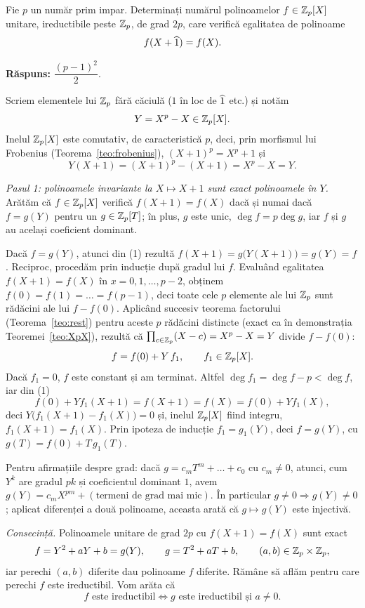 \begin{problema}
Fie $p$ un număr prim impar. Determinați numărul polinoamelor $f\in\mathbb{Z}_p[X]$ unitare, ireductibile peste $\mathbb{Z}_p$, de grad $2p$, care verifică egalitatea de polinoame
\[
  f(X+\widehat{1})=f(X).
\]
\end{problema}

\noindent\textbf{Răspuns:} $\dfrac{(p-1)^2}{2}$.

\begin{solutie}
Scriem elementele lui $\mathbb{Z}_p$ fără căciulă ($1$ în loc de $\widehat{1}$ etc.) și notăm
\[
  Y=X^p-X\in\mathbb{Z}_p[X].
\]
Inelul $\mathbb{Z}_p[X]$ este comutativ, de caracteristică $p$, deci, prin morfismul lui Frobenius (Teorema~\ref{teo:frobenius}), $(X+1)^p=X^p+1$ și
\[
  Y(X+1)=(X+1)^p-(X+1)=X^p-X=Y. \tag{1}
\]

\emph{Pasul 1: polinoamele invariante la $X\mapsto X+1$ sunt exact polinoamele în $Y$.} Arătăm că $f\in\mathbb{Z}_p[X]$ verifică $f(X+1)=f(X)$ dacă și numai dacă $f=g(Y)$ pentru un $g\in\mathbb{Z}_p[T]$; în plus, $g$ este unic, $\deg f=p\deg g$, iar $f$ și $g$ au același coeficient dominant.

Dacă $f=g(Y)$, atunci din (1) rezultă $f(X+1)=g\bigl(Y(X+1)\bigr)=g(Y)=f$. Reciproc, procedăm prin inducție după gradul lui $f$. Evaluând egalitatea $f(X+1)=f(X)$ în $x=0,1,\dots,p-2$, obținem $f(0)=f(1)=\dots=f(p-1)$, deci toate cele $p$ elemente ale lui $\mathbb{Z}_p$ sunt rădăcini ale lui $f-f(0)$. Aplicând succesiv teorema factorului (Teorema~\ref{teo:rest}) pentru aceste $p$ rădăcini distincte (exact ca în demonstrația Teoremei~\ref{teo:XpX}), rezultă că $\prod_{c\in\mathbb{Z}_p}(X-c)=X^p-X=Y$ divide $f-f(0)$:
\[
  f=f(0)+Y\,f_1,\qquad f_1\in\mathbb{Z}_p[X].
\]
Dacă $f_1=0$, $f$ este constant și am terminat. Altfel $\deg f_1=\deg f-p<\deg f$, iar din (1)
\[
  f(0)+Y f_1(X+1)=f(X+1)=f(X)=f(0)+Y f_1(X),
\]
deci $Y\bigl(f_1(X+1)-f_1(X)\bigr)=0$ și, inelul $\mathbb{Z}_p[X]$ fiind integru, $f_1(X+1)=f_1(X)$. Prin ipoteza de inducție $f_1=g_1(Y)$, deci $f=g(Y)$, cu $g(T)=f(0)+T\,g_1(T)$.

Pentru afirmațiile despre grad: dacă $g=c_mT^m+\dots+c_0$ cu $c_m\neq0$, atunci, cum $Y^k$ are gradul $pk$ și coeficientul dominant $1$, avem $g(Y)=c_mX^{pm}+(\text{termeni de grad mai mic})$. În particular $g\neq0\Rightarrow g(Y)\neq0$; aplicat diferenței a două polinoame, aceasta arată că $g\mapsto g(Y)$ este injectivă.

\emph{Consecință.} Polinoamele unitare de grad $2p$ cu $f(X+1)=f(X)$ sunt exact
\[
  f=Y^2+aY+b=g(Y),\qquad g=T^2+aT+b,\qquad (a,b)\in\mathbb{Z}_p\times\mathbb{Z}_p,
\]
iar perechi $(a,b)$ diferite dau polinoame $f$ diferite. Rămâne să aflăm pentru care perechi $f$ este ireductibil. Vom arăta că
\[
  f \text{ este ireductibil} \iff g \text{ este ireductibil și } a\neq 0. \tag{2}
\]


\end{solutie}
